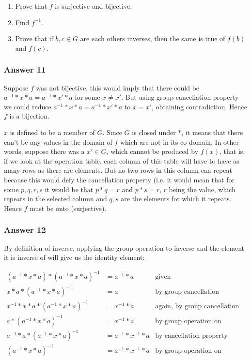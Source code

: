 \documentclass[11pt]{article}
\begin{document}
\begin{enumerate}
\item Prove that $f$ is surjective and bijective.
\item Find $f^{-1}$.
\item Prove that if $b, c \in G$ are each others inverses, then the same is
true of $f(b)$ and $f(c)$.
\end{enumerate}

\subsubsection{Answer 11}
\label{sec-1-4-1}
Suppose $f$ was not bijective, this would imply that there could be
$a^{-1} * x * a = a^{-1} * x' * a$ for some $x \neq x'$.  But using group
cancellation property we could reduce $a^{-1} * x * a = a^{-1} * x' * a$ to
$x = x'$, obtaining contradiction.  Hence $f$ is a bijection.

$x$ is defined to be a member of $G$.  Since $G$ is closed under $*$, it
means that there can't be any values in the domain of $f$ which are not in
its co-domain.  In other words, suppose there was a $x' \in G$, which cannot
be produced by $f(x)$, that is, if we look at the operation table, each
column of this table will have to have as many rows as there are elements.
But no two rows in this column can repeat because this would defy the
cancellation property (i.e. it would mean that for some $p, q, r, s$ it
would be that $p * q = r$ and $p * s = r$, $r$ being the value, which repeats
in the selected column and $q, s$ are the elements for which it repeats.
Hence $f$ must be onto (surjective).
\subsubsection{Answer 12}
\label{sec-1-4-2}
By definition of inverse, applying the group operation to inverse and the
element it is inverse of will give us the identity element:

\begin{align*}
  (a^{-1} * x * a) * (a^{-1} * x * a)^{-1} & = a^{-1} * a
  & \textrm{given} \\
  x * a * (a^{-1} * x * a)^{-1} & = a
  & \textrm{by group cancellation property} \\
  x^{-1} * x * a * (a^{-1} * x * a)^{-1} & = x^{-1} * a
  & \textrm{again, by group cancellation property} \\
  a * (a^{-1} * x * a)^{-1} & = x^{-1} * a
  & \textrm{by group operation on inverses} \\
  a^{-1} * a * (a^{-1} * x * a)^{-1} & = a^{-1} * x^{-1} * a
  & \textrm{by cancellation property} \\
  (a^{-1} * x * a)^{-1} & = a^{-1} * x^{-1} * a
  & \textrm{by group operation on inverses}
\end{align*}
\end{document}
